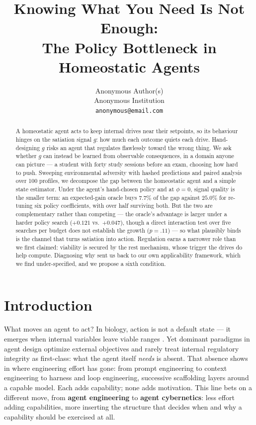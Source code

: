 \documentclass{article}
\title{Knowing What You Need Is Not Enough:\\ The Policy Bottleneck in Homeostatic Agents}
\author{%
  Anonymous Author(s) \\
  Anonymous Institution \\
  \texttt{anonymous@email.com} \\
}
\begin{document}
\maketitle

\begin{abstract}
A homeostatic agent acts to keep internal drives near their setpoints, so its behaviour hinges on the satiation signal $g$: how much each outcome quiets each drive. Hand-designing $g$ risks an agent that regulates flawlessly toward the wrong thing. We ask whether $g$ can instead be learned from observable consequences, in a domain anyone can picture --- a student with forty study sessions before an exam, choosing how hard to push. Sweeping environmental adversity with hashed predictions and paired analysis over 100 profiles, we decompose the gap between the homeostatic agent and a simple state estimator. Under the agent's hand-chosen policy and at $\phi{=}0$, signal quality is the smaller term: an expected-gain oracle buys $7.7\%$ of the gap against $25.0\%$ for re-tuning six policy coefficients, with over half surviving both. But the two are complementary rather than competing --- the oracle's advantage is larger under a harder policy search ($+0.121$ vs.\ $+0.047$), though a direct interaction test over five searches per budget does not establish the growth ($p{=}.11$) --- so what plausibly binds is the channel that turns satiation into action. Regulation earns a narrower role than we first claimed: viability is secured by the rest mechanism, whose trigger the drives do help compute. Diagnosing why sent us back to our own applicability framework, which we find under-specified, and we propose a sixth condition.
\end{abstract}

\section{Introduction}

What moves an agent to act? In biology, action is not a default state --- it emerges when internal variables leave viable ranges \cite{Cannon1932}. Yet dominant paradigms in agent design optimize external objectives and rarely treat internal regulatory integrity as first-class: what the agent itself \emph{needs} is absent. That absence shows in where engineering effort has gone: from prompt engineering to context engineering to harness and loop engineering, successive scaffolding layers around a capable model. Each adds capability; none adds motivation. This line bets on a different move, from \textbf{agent engineering} to \textbf{agent cybernetics}: less effort adding capabilities, more inserting the structure that decides when and why a capability should be exercised at all.
\end{document}
